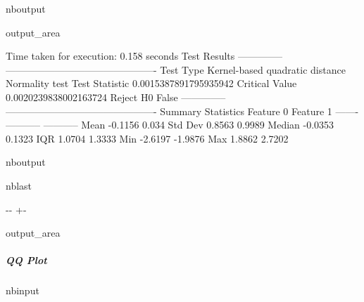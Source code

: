 \documentclass[letterpaper,10pt,english,openany,oneside]{sphinxmanual}
\begin{document}
{{{{\begin{sphinxuseclass}{nboutput}
{\begin{sphinxuseclass}{output_area}
\begin{sphinxuseclass}{}
\begin{sphinxVerbatim}[commandchars=\\\{\}]
Time taken for execution: 0.158 seconds
Test Results
--------------  ----------------------------------------------
Test Type       Kernel-based quadratic distance Normality test
Test Statistic  0.0015387891795935942
Critical Value  0.0020239838002163724
Reject H0       False
--------------  ----------------------------------------------
Summary Statistics
           Feature 0    Feature 1
-------  -----------  -----------
Mean         -0.1156       0.034
Std Dev       0.8563       0.9989
Median       -0.0353       0.1323
IQR           1.0704       1.3333
Min          -2.6197      -1.9876
Max           1.8862       2.7202
\end{sphinxVerbatim}



\end{sphinxuseclass}
\end{sphinxuseclass}
}

\end{sphinxuseclass}
\begin{sphinxuseclass}{nboutput}
\begin{sphinxuseclass}{nblast}
{

\kern-\sphinxverbatimsmallskipamount\kern-\baselineskip
\kern+\FrameHeightAdjust\kern-\fboxrule
\vspace{\nbsphinxcodecellspacing}

\begin{sphinxuseclass}{output_area}
\begin{sphinxuseclass}{}


\begin{sphinxVerbatim}[commandchars=\\\{\}]

\end{sphinxVerbatim}

\end{sphinxuseclass}
\end{sphinxuseclass}
}

\end{sphinxuseclass}
\end{sphinxuseclass}

\subparagraph{QQ Plot}
\label{\detokenize{user_guide/basic_usage:QQ-Plot}}
\begin{sphinxuseclass}{nbinput}
{
\begin{sphinxVerbatim}[commandchars=\\\{\}]
\llap{\color{nbsphinxin}[6]:\,\hspace{\fboxrule}\hspace{\fboxsep}}   


\end{sphinxVerbatim}}
\end{sphinxuseclass}}}}}
\end{document}

